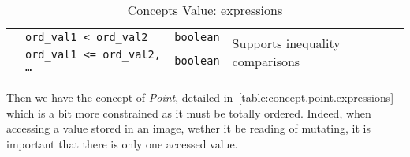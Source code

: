 \begin{table}[!htbp]
\begin{scriptsize}
\begin{tabular}{llll}
      \multicolumn{1}{c|}{}                                 & \texttt{ord\_val1 < ord\_val2}                                       & \texttt{boolean}
                                                            & \multicolumn{1}{l}{\multirow{2}{*}{Supports inequality comparisons}}                    \\
      \multicolumn{1}{c|}{}                                 & \texttt{ord\_val1 <= ord\_val2, \dots}                               & \texttt{boolean}
                                                            & \multicolumn{1}{l}{}                                                                    \\
      \cline{1-4}
    \end{tabular}
    \smallskip

    \caption{Concepts Value: expressions}
  \end{scriptsize}
  \label{table:concept.value.expressions}
\end{table}

Then we have the concept of \emph{Point}, detailed in~\cref{table:concept.point.expressions} which is a bit more
constrained as it must be totally ordered. Indeed, when accessing a value stored in an image, wether it be reading of
mutating, it is important that there is only one accessed value.

